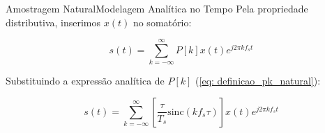 \begin{frame}{Amostragem Natural}{Modelagem Analítica no Tempo}
	Pela propriedade distributiva, inserimos $x(t)$ no somatório:
	
	\begin{equation*}
		s(t) = \sum_{k=-\infty}^{\infty} P[k] x(t) e^{j 2\pi k f_s t}
	\end{equation*}
	
	
	Substituindo a expressão analítica de $P[k]$ (\ref{eq: definicao_pk_natural}):
	
	\begin{equation*}
		s(t) = \sum_{k=-\infty}^{\infty} \left[ \frac{\tau}{T_s} \text{sinc}(k f_s \tau) \right] x(t) e^{j 2\pi k f_s t}
	\end{equation*}
\end{frame}

